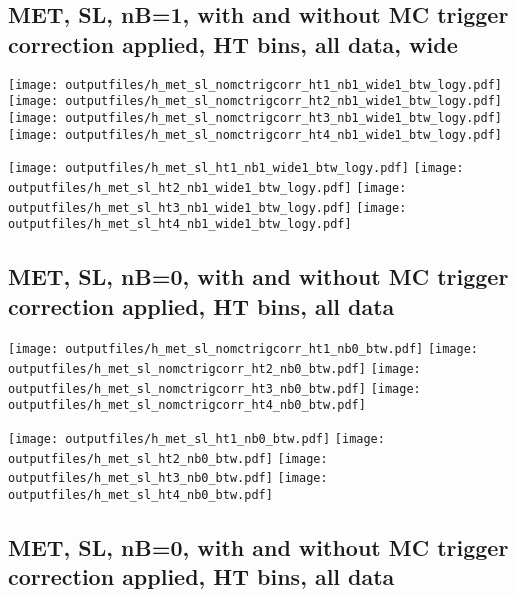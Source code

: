 \documentclass[11pt]{article}
\begin{document}
    \clearpage
     \subsection{ MET, SL, nB=1, with and without MC trigger correction applied, HT bins, all data, wide}

    \noindent
     \texttt{[image: outputfiles/h\_met\_sl\_nomctrigcorr\_ht1\_nb1\_wide1\_btw\_logy.pdf]}
     \texttt{[image: outputfiles/h\_met\_sl\_nomctrigcorr\_ht2\_nb1\_wide1\_btw\_logy.pdf]}
     \texttt{[image: outputfiles/h\_met\_sl\_nomctrigcorr\_ht3\_nb1\_wide1\_btw\_logy.pdf]}
     \texttt{[image: outputfiles/h\_met\_sl\_nomctrigcorr\_ht4\_nb1\_wide1\_btw\_logy.pdf]}


    \noindent
     \texttt{[image: outputfiles/h\_met\_sl\_ht1\_nb1\_wide1\_btw\_logy.pdf]}
     \texttt{[image: outputfiles/h\_met\_sl\_ht2\_nb1\_wide1\_btw\_logy.pdf]}
     \texttt{[image: outputfiles/h\_met\_sl\_ht3\_nb1\_wide1\_btw\_logy.pdf]}
     \texttt{[image: outputfiles/h\_met\_sl\_ht4\_nb1\_wide1\_btw\_logy.pdf]}


     \clearpage
     \subsection{ MET, SL, nB=0, with and without MC trigger correction applied, HT bins, all data}

    \noindent
     \texttt{[image: outputfiles/h\_met\_sl\_nomctrigcorr\_ht1\_nb0\_btw.pdf]}
     \texttt{[image: outputfiles/h\_met\_sl\_nomctrigcorr\_ht2\_nb0\_btw.pdf]}
     \texttt{[image: outputfiles/h\_met\_sl\_nomctrigcorr\_ht3\_nb0\_btw.pdf]}
     \texttt{[image: outputfiles/h\_met\_sl\_nomctrigcorr\_ht4\_nb0\_btw.pdf]}

    \noindent
     \texttt{[image: outputfiles/h\_met\_sl\_ht1\_nb0\_btw.pdf]}
     \texttt{[image: outputfiles/h\_met\_sl\_ht2\_nb0\_btw.pdf]}
     \texttt{[image: outputfiles/h\_met\_sl\_ht3\_nb0\_btw.pdf]}
     \texttt{[image: outputfiles/h\_met\_sl\_ht4\_nb0\_btw.pdf]}

    \clearpage
     \subsection{ MET, SL, nB=0, with and without MC trigger correction applied, HT bins, all data}
\end{document}
